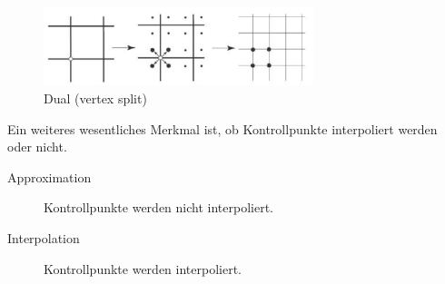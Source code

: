 \begin{figure}
  \centering
  \includegraphics[width=0.7\textwidth]{content/media/sd_dual}
  \caption{Dual (vertex split) \cite{Standford.24.07.2015}}
  \label{fig:sd_dual}
\end{figure}

Ein weiteres wesentliches Merkmal ist, ob Kontrollpunkte interpoliert werden oder nicht. 
\begin{description}
 \item[Approximation] Kontrollpunkte werden nicht interpoliert.
 \item[Interpolation] Kontrollpunkte werden interpoliert.
\end{description}

